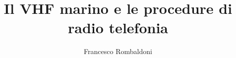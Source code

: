 \documentclass{beamer}
\title{Il VHF marino e le procedure di radio telefonia}
\author{Francesco Rombaldoni}
\date{}
\institute{Università degli Studi di Urbino "Carlo Bo"}
\begin{document}
	
	\begin{frame} 
		\maketitle 		
	\end{frame}
	
	
\end{document}
